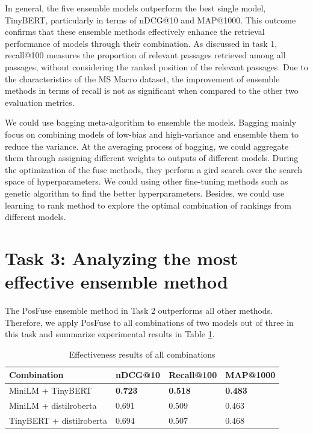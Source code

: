 \documentclass[acmsmall]{acmart}
\begin{document}
In general, the five ensemble models outperform the best single model, TinyBERT, particularly in terms of nDCG@10 and MAP@1000. This outcome confirms that these ensemble methods effectively enhance the retrieval performance of models through their combination. As discussed in task 1, recall@100 measures the proportion of relevant passages retrieved among all passages, without considering the ranked position of the relevant passages. Due to the characteristics of the MS Macro dataset, the improvement of ensemble methods in terms of recall is not as significant when compared to the other two evaluation metrics.

We could use bagging meta-algorithm to ensemble the models. Bagging mainly focus on combining models of low-bias and high-variance and ensemble them to reduce the variance. At the averaging process of bagging, we could aggregate them through assigning different weights to outputs of different models. During the optimization of the fuse methods, they perform a gird search over the search space of hyperparameters. We could using other fine-tuning methods such as genetic algorithm to find the better hyperparameters. Besides, we could use learning to rank method to explore the optimal combination of rankings from different models.
\section{Task 3: Analyzing the most effective ensemble method}
The PosFuse ensemble method in Task 2 outperforms all other methods. Therefore, we apply PosFuse to all combinations of two models out of three in this task and summarize experimental results in Table \ref{tab:results-task3}.
\begin{table}[!ht]
    \centering
    \caption{Effectiveness results of all combinations}
    \label{tab:results-task3}
    \begin{tabular}{llll}
       \toprule
       \textbf{Combination} & \textbf{nDCG@10} & \textbf{Recall@100} & \textbf{MAP@1000}\\
       \midrule
       MiniLM + TinyBERT & \textbf{0.723} & \textbf{0.518} & \textbf{0.483}\\
       MiniLM + distilroberta & 0.691 & 0.509 & 0.463\\
       TinyBERT + distilroberta & 0.694 & 0.507 & 0.468\\
       \bottomrule
    \end{tabular}
\end{table}
\end{document}
